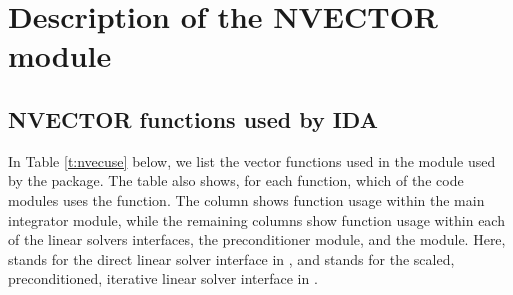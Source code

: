 \chapter{Description of the NVECTOR module}\label{s:nvector}



\section{NVECTOR functions used by IDA}

In Table \ref{t:nvecuse} below, we list the vector functions used in the 
{\nvector} module used by the {\ida} package.
The table also shows, for each function, which of the code modules uses
the function. The {\ida} column shows function usage within the main
integrator module, while the remaining columns show function usage
within each of the {\ida} linear solvers interfaces, the {\idabbdpre}
preconditioner module, and the {\fida} module.  Here,
{\idadls} stands for the direct linear solver interface in {\ida}, and
{\idaspils} stands for the scaled, preconditioned, iterative linear
solver interface in {\ida}.

